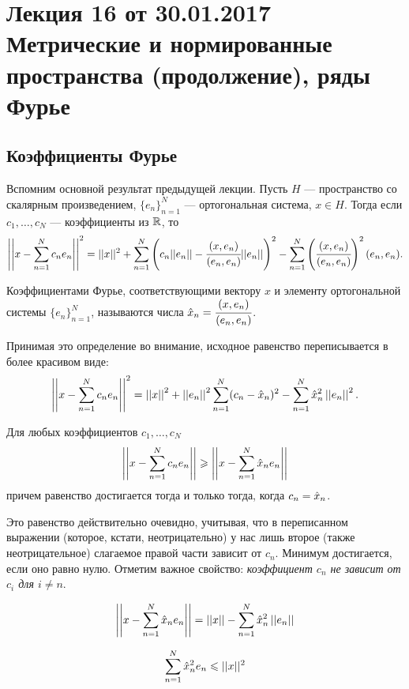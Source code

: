 \documentclass[a4paper, 12pt]{article}
\begin{document}
\pagestyle{fancy}
\section{Лекция 16 от 30.01.2017 \\ Метрические и нормированные пространства (продолжение), ряды Фурье}
\subsection{Коэффициенты Фурье}
Вспомним основной результат предыдущей лекции. Пусть $H$ --- пространство со скалярным произведением, $\{e_n\}_{n=1}^{N}$ --- ортогональная система, $x \in H$. Тогда если $c_1, \ldots, c_N$ --- коэффициенты из $\mathbb{R}$, то 
\begin{gather*}
    \left|\left|x - \sum\limits_{n= 1}^{N}c_ne_n\right|\right|^2 = ||x||^2 +\sum\limits_{n=1}^{N}\left(c_n||e_n|| - \cfrac{(x, e_n)}{(e_n, e_n)}||e_n||\right)^2 - \sum\limits_{n =1 }^{N} \left(\cfrac{(x, e_n)}{(e_n, e_n)}\right)^2(e_n, e_n).
\end{gather*}
\begin{Def}
    Коэффициентами Фурье, соответствующими вектору $x$ и элементу ортогональной системы $\{e_n\}_{n=1}^{N}$, называются числа $\hat{x}_n = \cfrac{(x, e_n)}{(e_n, e_n)}$.
\end{Def}
Принимая это определение во внимание, исходное равенство переписывается в более красивом виде:
\begin{gather*}
    \left|\left|x - \sum\limits_{n= 1}^{N}c_ne_n\right|\right|^2 = \left|\left|x\right|\right|^2 + \left|\left|e_n\right|\right|^2 \sum\limits_{n=1}^{N}(c_n - \hat{x}_n)^2 - \sum\limits_{n =1}^{N}\hat{x}_n^2 
    \left|\left|e_n\right|\right|^2.
\end{gather*}
\begin{Statement}[очевидное]
    Для любых коэффициентов $c_1, \ldots, c_N$
    $$
        \left|\left| x - \sum\limits_{n=1}^{N}c_n e_n\right|\right|\geqslant \left|\left|x -  \sum\limits_{n=1}^{N}\hat{x}_n e_n\right|\right|
    $$
    причем равенство достигается тогда и только тогда, когда $c_n = \hat{x}_n$.
\end{Statement}
Это равенство действительно очевидно, учитывая, что в переписанном выражении (которое, кстати, неотрицательно) у нас лишь второе (также неотрицательное) слагаемое правой части зависит от $c_n$. Минимум достигается, если оно равно нулю.
Отметим важное свойство: \textit{коэффициент $c_n$ не зависит от $c_i$ для $i \neq n$}.
\begin{Statement}
    $$
        \left|\left|x - \sum\limits_{n=1}^{N}\hat{x}_ne_n\right|\right| = \left|\left|x\right|\right| - \sum\limits_{n=1}^{N} \hat{x}_n^2 \left|\left|e_n\right|\right|
    $$
\end{Statement}
\begin{Consequence}
    $$\sum\limits_{n=1}^{N} \hat{x}_n^2e_n\leqslant ||x||^2$$
\end{Consequence}
\end{document}
